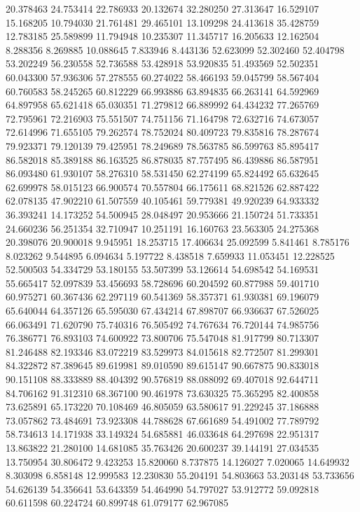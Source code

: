 20.378463
24.753414
22.786933
20.132674
32.280250
27.313647
16.529107
15.168205
10.794030
21.761481
29.465101
13.109298
24.413618
35.428759
12.783185
25.589899
11.794948
10.235307
11.345717
16.205633
12.162504
8.288356
8.269885
10.088645
7.833946
8.443136
52.623099
52.302460
52.404798
53.202249
56.230558
52.736588
53.428918
53.920835
51.493569
52.502351
60.043300
57.936306
57.278555
60.274022
58.466193
59.045799
58.567404
60.760583
58.245265
60.812229
66.993886
63.894835
66.263141
64.592969
64.897958
65.621418
65.030351
71.279812
66.889992
64.434232
77.265769
72.795961
72.216903
75.551507
74.751156
71.164798
72.632716
74.673057
72.614996
71.655105
79.262574
78.752024
80.409723
79.835816
78.287674
79.923371
79.120139
79.425951
78.249689
78.563785
86.599763
85.895417
86.582018
85.389188
86.163525
86.878035
87.757495
86.439886
86.587951
86.093480
61.930107
58.276310
58.531450
62.274199
65.824492
65.632645
62.699978
58.015123
66.900574
70.557804
66.175611
68.821526
62.887422
62.078135
47.902210
61.507559
40.105461
59.779381
49.920239
64.933332
36.393241
14.173252
54.500945
28.048497
20.953666
21.150724
51.733351
24.660236
56.251354
32.710947
10.251191
16.160763
23.563305
24.275368
20.398076
20.900018
9.945951
18.253715
17.406634
25.092599
5.841461
8.785176
8.023262
9.544895
6.094634
5.197722
8.438518
7.659933
11.053451
12.228525
52.500503
54.334729
53.180155
53.507399
53.126614
54.698542
54.169531
55.665417
52.097839
53.456693
58.728696
60.204592
60.877988
59.401710
60.975271
60.367436
62.297119
60.541369
58.357371
61.930381
69.196079
65.640044
64.357126
65.595030
67.434214
67.898707
66.936637
67.526025
66.063491
71.620790
75.740316
76.505492
74.767634
76.720144
74.985756
76.386771
76.893103
74.600922
73.800706
75.547048
81.917799
80.713307
81.246488
82.193346
83.072219
83.529973
84.015618
82.772507
81.299301
84.322872
87.389645
89.619981
89.010590
89.615147
90.667875
90.833018
90.151108
88.333889
88.404392
90.576819
88.088092
69.407018
92.644711
84.706162
91.312310
68.367100
90.461978
73.630325
75.365295
82.400858
73.625891
65.173220
70.108469
46.805059
63.580617
91.229245
37.186888
73.057862
73.484691
73.923308
44.788628
67.661689
54.491002
77.789792
58.734613
14.171938
33.149324
54.685881
46.033648
64.297698
22.951317
13.863822
21.280100
14.681085
35.763426
20.600237
39.144191
27.034535
13.750954
30.806472
9.423253
15.820060
8.737875
14.126027
7.020065
14.649932
8.303098
6.858148
12.999583
12.230830
55.204191
54.803663
53.203148
53.733656
54.626139
54.356641
53.643359
54.464990
54.797027
53.912772
59.092818
60.611598
60.224724
60.899748
61.079177
62.967085
